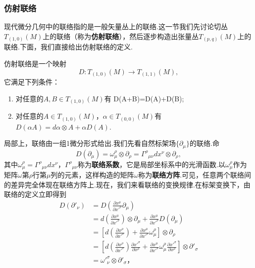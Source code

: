		\subsubsection{仿射联络}
		现代微分几何中的联络指的是一般矢量丛上的联络.这一节我们先讨论切丛$T_{(1,0)}(M)$上的联络（称为\textbf{仿射联络}），然后逐步构造出张量丛$T_{(p,q)}(M)$上的联络.下面，我们直接给出仿射联络的定义.
		\begin{definition}
			仿射联络是一个映射
			\begin{equation*}
				D:T_{(1,0)}(M)\rightarrow T_{(1,1)}(M),
			\end{equation*}
			它满足下列条件：
			\begin{enumerate}
				\item 对任意的$A,B\in T_{(1,0)}(M)$有 D(A+B)=D(A)+D(B);						
				\item 对任意的$A\in T_{(1,0)}(M)，\alpha\in T_{(0,0)}(M)$有$D(\alpha A)=d\alpha\otimes A+\alpha D(A)$.
			\end{enumerate}
		\end{definition}
		局部上，联络由一组1微分形式给出.我们先看自然标架场$\{\partial_\mu\}$的联络.命
		\begin{equation}
		D(\partial_\mu)=\omega^\rho_\mu \otimes\partial_\rho={\Gamma^\rho}_{\mu\nu}dx^\nu\otimes \partial_\rho,
		\end{equation} 
		其中$\omega^\rho_\mu={\Gamma^\rho}_{\mu\nu}dx^\nu$，${\Gamma^\rho}_{\mu\nu}$称为\textbf{联络系数}，它是局部坐标系中的光滑函数.以$\omega^\rho_\mu$作为矩阵$\omega$第$\rho$行第$\mu$列的元素，这样构造的矩阵$\omega$称为\textbf{联络方阵}.可见，任意两个联络间的差异完全体现在联络方阵上.现在，我们来看联络的变换规律.在标架变换下，由联络的定义立即得到			 
		\begin{equation}
			\begin{split}
			D(\partial'_\nu) &= D\left(\frac{\partial{x^\mu}}{\partial{x'}^\nu}{\partial}_\mu\right) \\
			&= d\left(\frac{\partial{x^\mu}}{\partial{x'}^\nu}\right)\otimes{\partial}_\mu+\frac{\partial{x^\mu}}{\partial{x'}^\nu}D\left({\partial}_\mu\right)\\
			&= \left[d\left(\frac{\partial{x^\rho}}{\partial{x'}^\nu}\right)+\frac{\partial{x^\mu}}{\partial{x'}^\nu}\omega^\rho_\mu\right]\otimes{\partial}_\rho\\
			&= \left[d\left(\frac{\partial{x^\rho}}{\partial{x'}^\nu}\right)\frac{\partial{{x'}^\sigma}}{\partial{x^\rho}}+\frac{\partial{x^\mu}}{\partial{x'}^\nu}\omega^\rho_\mu\frac{\partial{{x'}^\sigma}}{\partial{x^\rho}}\right]\otimes\partial'_\sigma\\
			&={\omega'}^\sigma_\nu\otimes\partial'_\sigma，
			\end{split}
		\end{equation}
